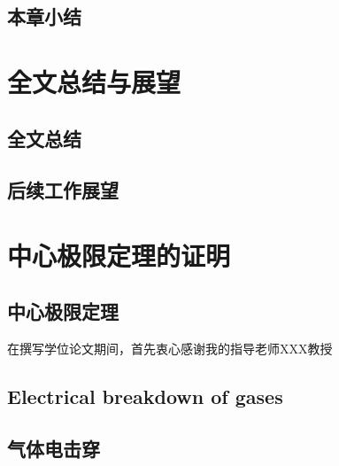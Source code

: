 \documentclass[bachelor]{NCEPU-thesis}
\begin{document}
\section{本章小结}

\chapter{全文总结与展望}

\section{全文总结}

\section{后续工作展望}






\nocite{*}


\thesisappendix

\chapter{中心极限定理的证明}

\section{中心极限定理}


\thesisacknowledgement
在撰写学位论文期间，首先衷心感谢我的指导老师XXX教授



\thesistranslationoriginal

\section{Electrical breakdown of gases}


\thesistranslationchinese

\section{气体电击穿}
\end{document}
